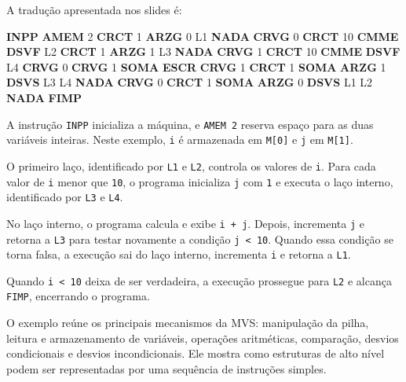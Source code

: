 \documentclass[
  brazilian,
  letterpaper,
]{book}
\newenvironment{Shaded}{\begin{snugshade}}{\end{snugshade}}
\newcommand{\DecValTok}[1]{\textcolor[rgb]{0.68,0.00,0.00}{#1}}
\newcommand{\FunctionTok}[1]{\textcolor[rgb]{0.28,0.35,0.67}{#1}}
\newcommand{\KeywordTok}[1]{\textcolor[rgb]{0.00,0.23,0.31}{\textbf{#1}}}
\theoremstyle{plain}
\theoremstyle{definition}
\theoremstyle{remark}
\begin{document}
A tradução apresentada nos slides é:

\begin{Shaded}
\begin{Highlighting}[]
    \KeywordTok{INPP}
    \KeywordTok{AMEM}  \DecValTok{2}
    \KeywordTok{CRCT}  \DecValTok{1}
    \KeywordTok{ARZG}  \DecValTok{0}
\FunctionTok{L1}  \KeywordTok{NADA}
    \KeywordTok{CRVG}  \DecValTok{0}
    \KeywordTok{CRCT}  \DecValTok{10}
    \KeywordTok{CMME}
    \KeywordTok{DSVF}  \FunctionTok{L2}
    \KeywordTok{CRCT}  \DecValTok{1}
    \KeywordTok{ARZG}  \DecValTok{1}
\FunctionTok{L3}  \KeywordTok{NADA}
    \KeywordTok{CRVG}  \DecValTok{1}
    \KeywordTok{CRCT}  \DecValTok{10}
    \KeywordTok{CMME}
    \KeywordTok{DSVF}  \FunctionTok{L4}
    \KeywordTok{CRVG}  \DecValTok{0}
    \KeywordTok{CRVG}  \DecValTok{1}
    \KeywordTok{SOMA}
    \KeywordTok{ESCR}
    \KeywordTok{CRVG}  \DecValTok{1}
    \KeywordTok{CRCT}  \DecValTok{1}
    \KeywordTok{SOMA}
    \KeywordTok{ARZG}  \DecValTok{1}
    \KeywordTok{DSVS}  \FunctionTok{L3}
\FunctionTok{L4}  \KeywordTok{NADA}
    \KeywordTok{CRVG}  \DecValTok{0}
    \KeywordTok{CRCT}  \DecValTok{1}
    \KeywordTok{SOMA}
    \KeywordTok{ARZG}  \DecValTok{0}
    \KeywordTok{DSVS}  \FunctionTok{L1}
\FunctionTok{L2}  \KeywordTok{NADA}
    \KeywordTok{FIMP}
\end{Highlighting}
\end{Shaded}

A instrução \texttt{INPP} inicializa a máquina, e \texttt{AMEM\ 2}
reserva espaço para as duas variáveis inteiras. Neste exemplo,
\texttt{i} é armazenada em \texttt{M{[}0{]}} e \texttt{j} em
\texttt{M{[}1{]}}.

O primeiro laço, identificado por \texttt{L1} e \texttt{L2}, controla os
valores de \texttt{i}. Para cada valor de \texttt{i} menor que
\texttt{10}, o programa inicializa \texttt{j} com \texttt{1} e executa o
laço interno, identificado por \texttt{L3} e \texttt{L4}.

No laço interno, o programa calcula e exibe \texttt{i\ +\ j}. Depois,
incrementa \texttt{j} e retorna a \texttt{L3} para testar novamente a
condição \texttt{j\ \textless{}\ 10}. Quando essa condição se torna
falsa, a execução sai do laço interno, incrementa \texttt{i} e retorna a
\texttt{L1}.

Quando \texttt{i\ \textless{}\ 10} deixa de ser verdadeira, a execução
prossegue para \texttt{L2} e alcança \texttt{FIMP}, encerrando o
programa.

O exemplo reúne os principais mecanismos da MVS: manipulação da pilha,
leitura e armazenamento de variáveis, operações aritméticas, comparação,
desvios condicionais e desvios incondicionais. Ele mostra como
estruturas de alto nível podem ser representadas por uma sequência de
instruções simples.
\end{document}
